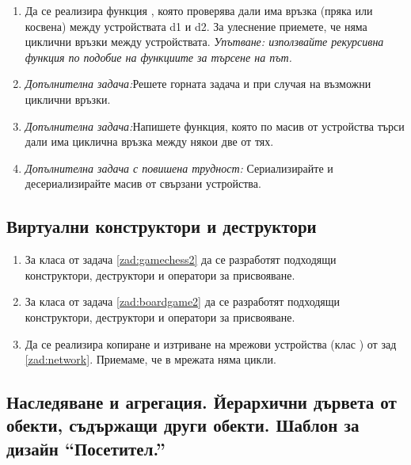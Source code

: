 \begin{enumerate}[resume]
\begin{enumerate}[label=\alph*)]
		\item Да се реализира функция , която проверява дали има връзка (пряка или косвена) между устройствата d1 и d2. За улеснение приемете, че няма циклични връзки между устройствата. \textit{Упътване: използвайте рекурсивна функция по подобие на функциите за търсене на път.}

		\item \textit{Допълнителна задача:}Решете горната задача и при случая на възможни циклични връзки.

		\item \textit{Допълнителна задача:}Напишете функция, която по масив от устройства търси дали има циклична връзка между някои две от тях.

		\item \textit{Допълнителна задача с повишена трудност:} Сериализирайте и десериализирайте масив от свързани устройства.
	\end{enumerate}




\end{enumerate}


\pagebreak

\subsection {Виртуални конструктори и деструктори}

\begin{enumerate}[resume]
  \item За класа  от задача \ref{zad:gamechess2} да се разработят подходящи конструктори, деструктори и оператори за присвояване.
  \item За класа  от задача \ref{zad:boardgame2} да се разработят подходящи конструктори, деструктори и оператори за присвояване.
  \item Да се реализира копиране и изтриване на мрежови устройства (клас ) от зад \ref{zad:network}. Приемаме, че в мрежата няма цикли.
\end{enumerate}


\pagebreak

\subsection {Наследяване и агрегация. Йерархични дървета от обекти, съдържащи други обекти. Шаблон за дизайн ``Посетител.''}

